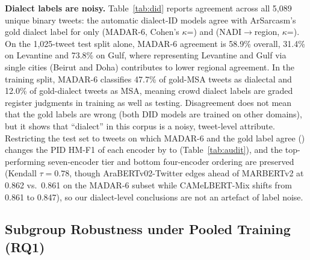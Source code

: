 \documentclass[11pt]{article}
\begin{document}
\textbf{Dialect labels are noisy.} Table~\ref{tab:did} reports agreement across all 5,089 unique binary tweets: the automatic dialect-ID models agree with ArSarcasm's gold dialect label for only \didAgree{} (MADAR-6, Cohen's $\kappa$=\didKappa) and \nadiAgree{} (NADI$\rightarrow$region, $\kappa$=\nadiKappa). On the 1,025-tweet test split alone, MADAR-6 agreement is 58.9\% overall, 31.4\% on Levantine and 73.8\% on Gulf, where representing Levantine and Gulf via single cities (Beirut and Doha) contributes to lower regional agreement. In the training split, MADAR-6 classifies 47.7\% of gold-MSA tweets as dialectal and 12.0\% of gold-dialect tweets as MSA, meaning crowd dialect labels are graded register judgments in training as well as testing. Disagreement does not mean that the gold labels are wrong (both DID models are trained on other domains), but it shows that ``dialect'' in this corpus is a noisy, tweet-level attribute. Restricting the test set to tweets on which MADAR-6 and the gold label agree (\didTestCounts) changes the PID HM-F1 of each encoder by \didDeltaMin{} to \didDeltaMax{} (Table~\ref{tab:audit}), and the top-performing seven-encoder tier and bottom four-encoder ordering are preserved (Kendall $\tau=0.78$, though AraBERTv02-Twitter edges ahead of MARBERTv2 at 0.862 vs.\ 0.861 on the MADAR-6 subset while CAMeLBERT-Mix shifts from 0.861 to 0.847), so our dialect-level conclusions are not an artefact of label noise.

\begin{table}[tbp]
\caption{Agreement of the gold ArSarcasm dialect label with automatic dialect identification over all binary tweets: overall agreement, Cohen's $\kappa$ and agreement per gold dialect.}
\label{tab:did}
\centering
\footnotesize
{}
\end{table}

\begin{table}[tbp]
\caption{Sensitivity of PID HM-F1 (mean over seeds) to the audits: test set without near-duplicated tweets, and test subset on which the MADAR-6 dialect-ID model agrees with the gold dialect. No model is retrained.}
\label{tab:audit}
\centering
\footnotesize
{}
\end{table}

\subsection{Subgroup Robustness under Pooled Training (RQ1)}
\label{sec:res_pooled}
\begin{table}[tbp]
\caption{Test macro-F1 pooled and per dialect, harmonic-mean (HM) and worst-dialect (WD) F1 over the four dialects. Fine-tuned models: mean over five seeds; LLMs: 8-shot, mean over three exemplar draws. Brackets: 95\% hierarchical bootstrap intervals (tweets within dialect, then seeds) of the same mean. HM and WD are averaged over seeds and may therefore differ slightly from HM and minimum of the averaged dialect columns.}
\label{tab:main_results}
\centering
\footnotesize
\setlength{\tabcolsep}{3.2pt}
\end{table}
\end{document}
